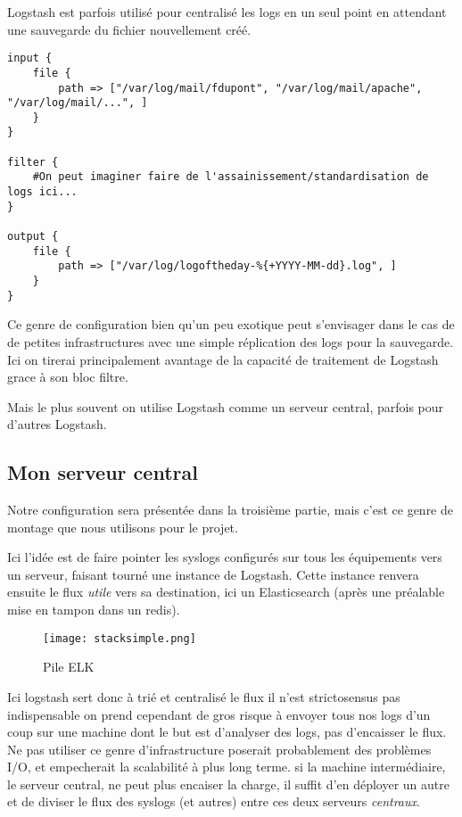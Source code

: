 Logstash est parfois utilisé pour centralisé les logs en un seul point en attendant
une sauvegarde du fichier nouvellement créé.


\begin{lstlisting}[style=logstash,label={lst:conflogstashminimale2},caption={Un autre exemple de configuration minime}]
input {
    file {
        path => ["/var/log/mail/fdupont", "/var/log/mail/apache", "/var/log/mail/...", ]
    }
}

filter {
    #On peut imaginer faire de l'assainissement/standardisation de logs ici...
}

output {
    file {
        path => ["/var/log/logoftheday-%{+YYYY-MM-dd}.log", ]
    }
}
\end{lstlisting}
Ce genre de configuration bien qu'un peu exotique peut s'envisager dans le cas de
de petites infrastructures avec une simple réplication des logs pour la sauvegarde.
Ici on tirerai principalement avantage de la capacité de traitement de Logstash grace
à son bloc filtre.

Mais le plus souvent on utilise Logstash comme un serveur central, parfois pour d'autres
Logstash.
\subsection{Mon serveur central}
Notre configuration sera présentée dans la troisième partie, mais c'est ce genre 
de montage que nous utilisons pour le projet.

Ici l'idée est de faire pointer les syslogs configurés sur tous les équipements vers
un serveur, faisant tourné une instance de Logstash. Cette instance renvera ensuite 
le flux \textit{utile} vers sa destination, ici un Elasticsearch (après une préalable
mise en tampon dans un redis).
\begin{figure}[H]
\center
\texttt{[image: stacksimple.png]}
\label{fig:elkstack1}
\caption{Pile ELK}
\end{figure}

Ici logstash sert donc à trié et centralisé le flux il n'est strictosensus pas indispensable
on prend cependant de gros risque à envoyer tous nos logs d'un coup sur une machine
dont le but est d'analyser des logs, pas d'encaisser le flux. 
Ne pas utiliser ce genre d'infrastructure poserait probablement des problèmes I/O,
et empecherait la scalabilité à plus long terme. si la machine intermédiaire, le 
serveur central, ne peut plus encaiser la charge, il suffit d'en déployer un autre
et de diviser le flux des syslogs (et autres) entre ces deux serveurs \textit{centraux}.


